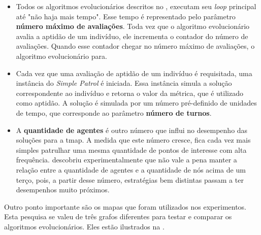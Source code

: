 \begin{itemize}
	\item Todos os algoritmos evolucionários descritos no , 
	executam seu \textit{loop} principal até "não haja mais tempo". Esse tempo é 
	representado pelo parâmetro \textbf{número máximo de avaliações}. Toda vez 
	que o algoritmo evolucionário avalia a aptidão de um indivíduo, ele 
	incrementa o contador do número de avaliações. Quando esse contador chegar 
	no número máximo de avaliações, o algoritmo evolucionário para.
	\item Cada vez que uma avaliação de aptidão de um indivíduo é requisitada, 
	uma instância do \textit{Simple Patrol} é iniciada. Essa instância simula 
	a solução correspondente ao indivíduo e retorna o valor da métrica, que é 
	utilizado como aptidão. A solução é simulada por um número pré-definido de 
	unidades de tempo, que corresponde ao parâmetro \textbf{número de turnos}.
	\item A \textbf{quantidade de agentes} é outro número que influi no 
	desempenho das soluções para a \ac{tmap}. A medida que este número cresce, 
	fica cada vez mais simples patrulhar uma mesma quantidade de pontos de 
	interesse com alta frequência. \citep{sampaiophd} descobriu 
	experimentalmente que não vale a pena manter a relação entre a quantidade de 
	agentes e a quantidade de nós acima de um terço, pois, a partir desse número, 
	estratégias bem distintas passam a ter desempenhos muito próximos.
\end{itemize}

Outro ponto importante são os mapas que foram utilizados nos experimentos. Esta 
pesquisa se valeu de três grafos diferentes para testar e comparar os algoritmos 
evolucionários. Eles estão ilustrados na .

